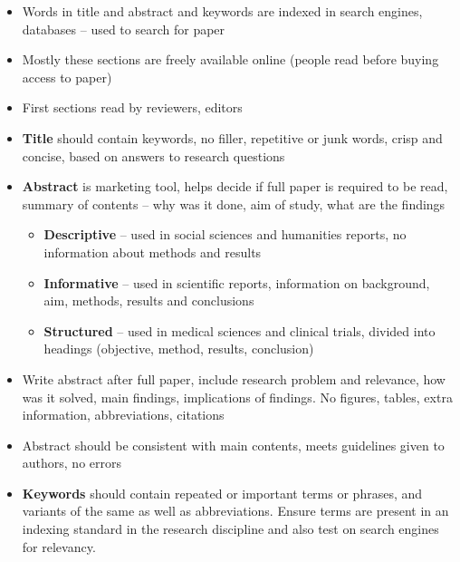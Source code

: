 \documentclass{article}
\begin{document}
\begin{itemize}
    \item Words in title and abstract and keywords are indexed in search engines, databases -- used to search for paper
    \item Mostly these sections are freely available online (people read before buying access to paper)
    \item First sections read by reviewers, editors
    \item \textbf{Title} should contain keywords, no filler, repetitive or junk words, crisp and concise, based on answers to research questions
    \item \textbf{Abstract} is marketing tool, helps decide if full paper is required to be read, summary of contents -- why was it done, aim of study, what are the findings
    \begin{itemize}
        \item \textbf{Descriptive} -- used in social sciences and humanities reports, no information about methods and results
        \item \textbf{Informative} -- used in scientific reports, information on background, aim, methods, results and conclusions
        \item \textbf{Structured} -- used in medical sciences and clinical trials, divided into headings (objective, method, results, conclusion)
    \end{itemize}
    \item Write abstract after full paper, include research problem and relevance, how was it solved, main findings, implications of findings. No figures, tables, extra information, abbreviations, citations
    \item Abstract should be consistent with main contents, meets guidelines given to authors, no errors
    \item \textbf{Keywords} should contain repeated or important terms or phrases, and variants of the same as well as abbreviations. Ensure terms are present in an indexing standard in the research discipline and also test on search engines for relevancy.
    
\end{itemize}
\end{document}
